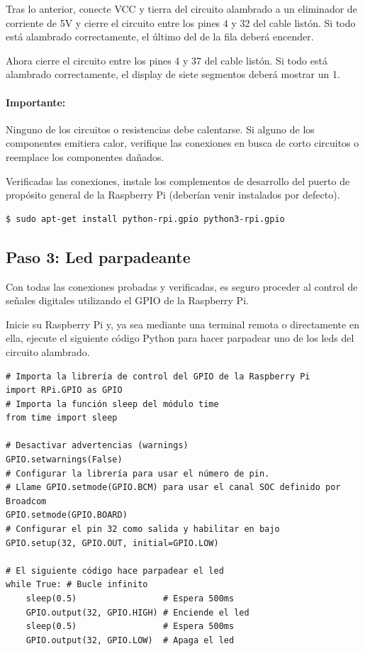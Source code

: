 \documentclass[letterpaper,10.5pt]{article}
\begin{document}
Tras lo anterior, conecte VCC y tierra del circuito alambrado a un eliminador de corriente de 5V y cierre el circuito entre los pines 4 y 32 del cable listón. Si todo está alambrado correctamente, el último del de la fila deberá encender.

Ahora cierre el circuito entre los pines 4 y 37 del cable listón. Si todo está alambrado correctamente, el display de siete segmentos deberá mostrar un 1.

\paragraph{Importante:} Ninguno de los circuitos o resistencias debe calentarse.
Si alguno de los componentes emitiera calor, verifique las conexiones en busca de corto circuitos o reemplace los componentes dañados.

Verificadas las conexiones, instale los complementos de desarrollo del puerto de propósito general de la Raspberry Pi (deberían venir instalados por defecto).

\begin{Verbatim}[fontsize=\footnotesize]
$ sudo apt-get install python-rpi.gpio python3-rpi.gpio
\end{Verbatim}

%
%
\subsection{Paso 3: Led parpadeante}%
\label{sec:step3}
Con todas las conexiones probadas y verificadas, es seguro proceder al control de señales digitales utilizando el GPIO de la Raspberry Pi.

Inicie su Raspberry Pi y, ya sea mediante una terminal remota o directamente en ella, ejecute el siguiente código Python para hacer parpadear uno de los leds del circuito alambrado.

\medskip
\begin{lstlisting}
# Importa la librería de control del GPIO de la Raspberry Pi
import RPi.GPIO as GPIO
# Importa la función sleep del módulo time
from time import sleep

# Desactivar advertencias (warnings)
GPIO.setwarnings(False)
# Configurar la librería para usar el número de pin.
# Llame GPIO.setmode(GPIO.BCM) para usar el canal SOC definido por Broadcom
GPIO.setmode(GPIO.BOARD)
# Configurar el pin 32 como salida y habilitar en bajo
GPIO.setup(32, GPIO.OUT, initial=GPIO.LOW)

# El siguiente código hace parpadear el led
while True: # Bucle infinito
	sleep(0.5)                 # Espera 500ms
	GPIO.output(32, GPIO.HIGH) # Enciende el led
	sleep(0.5)                 # Espera 500ms
	GPIO.output(32, GPIO.LOW)  # Apaga el led
\end{lstlisting}
\medskip
\end{document}
